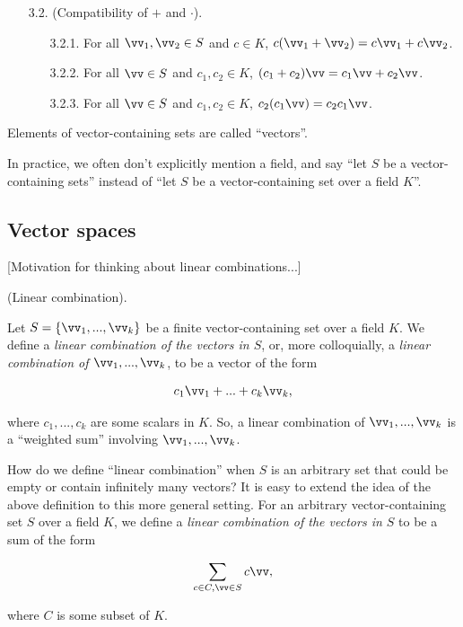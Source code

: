 \begin{defn}
\begin{enumerate}
\begin{enumerate}
\begin{enumerate}
            \end{enumerate}
            \item[3.2.] (Compatibility of $+$ and $\cdot$).
            \begin{enumerate}
                \item[3.2.1.] For all $\vv_1, \vv_2 \in S$ and $c \in K$, $c(\vv_1 + \vv_2) = c \vv_1 + c \vv_2$.
                \item[3.2.2.] For all $\vv \in S$ and $c_1, c_2 \in K$, $(c_1 + c_2)\vv = c_1 \vv + c_2 \vv$.
                \item[3.2.3.] For all $\vv \in S$ and $c_1, c_2 \in K$, $c_2 (c_1 \vv) = c_2 c_1 \vv$.
            \end{enumerate}
        \end{enumerate}
    \end{enumerate}
    
    Elements of vector-containing sets are called ``vectors''.
    
    In practice, we often don't explicitly mention a field, and say ``let $S$ be a vector-containing sets'' instead of ``let $S$ be a vector-containing set over a field $K$''.
\end{defn}

\newpage

\subsection*{Vector spaces}

[Motivation for thinking about linear combinations...]

\begin{defn}
    (Linear combination).
    
    Let $S = \{\vv_1, ..., \vv_k\}$ be a finite vector-containing set over a field $K$. We define a \textit{linear combination of the vectors in $S$}, or, more colloquially, a \textit{linear combination of $\vv_1, ..., \vv_k$}, to be a vector of the form
    
    \begin{align*}
        c_1 \vv_1 + ... + c_k \vv_k,
    \end{align*}
    
    where $c_1, ..., c_k$ are some scalars in $K$. So, a linear combination of $\vv_1, ..., \vv_k$ is a ``weighted sum'' involving $\vv_1, ..., \vv_k$.
    
    How do we define ``linear combination'' when $S$ is an arbitrary set that could be empty or contain infinitely many vectors? It is easy to extend the idea of the above definition to this more general setting. For an arbitrary vector-containing set $S$ over a field $K$, we define a \textit{linear combination of the vectors in $S$} to be a sum of the form
    
    \begin{align*}
        \sum_{c \in C, \vv \in S} c \vv,
    \end{align*}
    
    where $C$ is some subset of $K$.
\end{defn}

